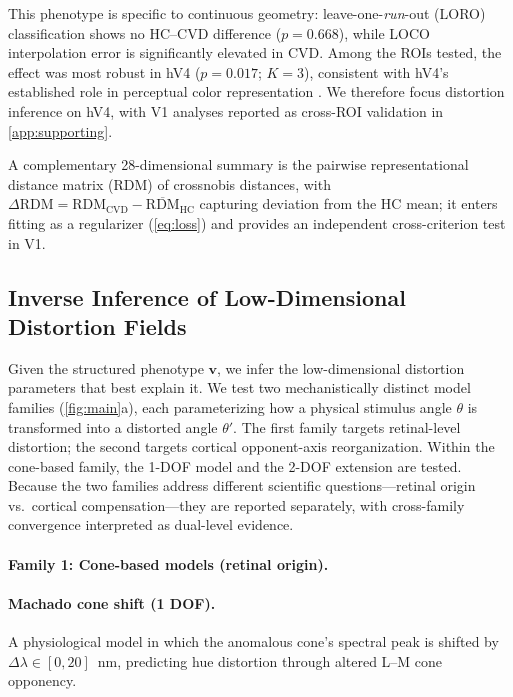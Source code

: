 \documentclass{article}
\begin{document}
This phenotype is specific to continuous geometry: leave-one-\emph{run}-out (LORO) classification shows no HC--CVD difference ($p = 0.668$), while LOCO interpolation error is significantly elevated in CVD.
Among the ROIs tested, the effect was most robust in hV4 ($p = 0.017$; $K{=}3$), consistent with hV4's established role in perceptual color representation \citep{brouwer2009, bannert2018}.
We therefore focus distortion inference on hV4, with V1 analyses reported as cross-ROI validation in \cref{app:supporting}.

A complementary 28-dimensional summary is the pairwise representational distance matrix (RDM) of crossnobis distances, with $\Delta\text{RDM} = \text{RDM}_{\text{CVD}} - \overline{\text{RDM}}_{\text{HC}}$ capturing deviation from the HC mean; it enters fitting as a regularizer (\cref{eq:loss}) and provides an independent cross-criterion test in V1.

\subsection{Inverse Inference of Low-Dimensional Distortion Fields}

Given the structured phenotype $\mathbf{v}$, we infer the low-dimensional distortion parameters that best explain it.
We test two mechanistically distinct model families (\cref{fig:main}a), each parameterizing how a physical stimulus angle $\theta$ is transformed into a distorted angle $\theta'$.
The first family targets retinal-level distortion; the second targets cortical opponent-axis reorganization.
Within the cone-based family, the 1-DOF model and the 2-DOF extension are tested.
Because the two families address different scientific questions---retinal origin vs.\ cortical compensation---they are reported separately, with cross-family convergence interpreted as dual-level evidence.

\paragraph{Family 1: Cone-based models (retinal origin).}

\paragraph{Machado cone shift (1 DOF).}
A physiological model \citep{machado2009} in which the anomalous cone's spectral peak is shifted by $\Delta\lambda \in [0, 20]$~nm, predicting hue distortion through altered L--M cone opponency.
\end{document}

